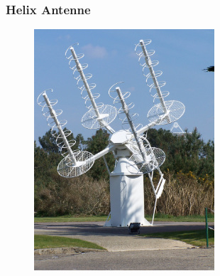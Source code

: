 \begin{frame}
  \frametitle{Helix Antenne}
  \begin{center}
    \begin{figure}
      \includegraphics[width=0.6\textwidth,height=.75\textheight,keepaspectratio]{a09/Traqueur_acquisition.JPG}
    \end{figure}
  \end{center}
\end{frame}

